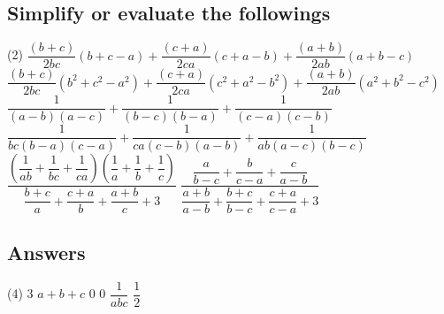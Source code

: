     \subsection*{Simplify or evaluate the followings}
		\begin{tasks}[label = \arabic*.,label-width = 1.5em](2)
			\task* $\dfrac{(b+c)}{2bc}(b+c-a)+\dfrac{(c+a)}{2ca}(c+a-b)+\dfrac{(a+b)}{2ab}(a+b-c)$
			\task* $\dfrac{(b+c)}{2bc}(b^2+c^2-a^2)+\dfrac{(c+a)}{2ca}(c^2+a^2-b^2)+\dfrac{(a+b)}{2ab}(a^2+b^2-c^2)$
			\task* $\dfrac{1}{(a-b)(a-c)}+\dfrac{1}{(b-c)(b-a)}+\dfrac{1}{(c-a)(c-b)}$ 
            \task* $\dfrac{1}{bc(b-a)(c-a)}+\dfrac{1}{ca(c-b)(a-b)}+\dfrac{1}{ab(a-c)(b-c)}$
            \task  $\dfrac{\left(\dfrac{1}{ab}+\dfrac{1}{bc}+\dfrac{1}{ca}\right)\left(\dfrac{1}{a}+\dfrac{1}{b}+\dfrac{1}{c}\right)}{\dfrac{b+c}{a}+\dfrac{c+a}{b}+\dfrac{a+b}{c}+3}$
            \task  $\dfrac{\dfrac{a}{b-c}+\dfrac{b}{c-a}+\dfrac{c}{a-b}}{\dfrac{a+b}{a-b}+\dfrac{b+c}{b-c}+\dfrac{c+a}{c-a}+3}$

		\end{tasks}

		\subsection*{Answers}
		\begin{tasks}[label = \arabic*.,label-width = 1.5em](4)
            \task $3$
			\task $a+b+c$
            \task $0$
            \task $0$
            \task $\dfrac{1}{abc}$
            \task $\dfrac{1}{2}$

		\end{tasks}
